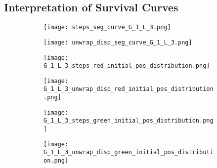    

\subsection{Interpretation of Survival Curves}


   \begin{figure}
        \centering
        \begin{subfigure}[b]{0.45\textwidth}
          \texttt{[image: steps\_seg\_curve\_G\_1\_L\_3.png]}
          \caption{}
          \label{fig:steps_seg_curve_G_1_L_3}
        \end{subfigure}
        \hfill
        \begin{subfigure}[b]{0.45\textwidth}
          \texttt{[image: unwrap\_disp\_seg\_curve\_G\_1\_L\_3.png]}
          \caption{}
          \label{fig:disp_seg_curve_G_1_L_3}
        \end{subfigure}
        \caption{}
        \label{fig:seg_curve_G_1_L_3_steps_disp}
   \end{figure}



   \begin{figure}
        \centering
        \begin{subfigure}[b]{0.45\textwidth}
          \texttt{[image: G\_1\_L\_3\_steps\_red\_initial\_pos\_distribution.png]}
          \caption{}
          \label{fig:G_1_L_3_steps_red_initial_pos_distribution}
        \end{subfigure}
        
        \begin{subfigure}[b]{0.45\textwidth}
          \texttt{[image: G\_1\_L\_3\_unwrap\_disp\_red\_initial\_pos\_distribution.png]}
          \caption{}
          \label{fig:G_1_L_3_disp_red_initial_pos_distribution}
        \end{subfigure}
        \caption{}
        \label{fig:G_1_L_3_steps_disp_red}
   \end{figure}


   \begin{figure}
        \centering
        \begin{subfigure}[b]{0.45\textwidth}
          \texttt{[image: G\_1\_L\_3\_steps\_green\_initial\_pos\_distribution.png]}
          \caption{}
          \label{fig:G_1_L_3_steps_green_initial_pos_distribution}
        \end{subfigure}
        
        \begin{subfigure}[b]{0.45\textwidth}
          \texttt{[image: G\_1\_L\_3\_unwrap\_disp\_green\_initial\_pos\_distribution.png]}
          \caption{}
          \label{fig:G_1_L_3_disp_green_initial_pos_distribution}
        \end{subfigure}
        \caption{}
        \label{fig:G_1_L_3_steps_disp_green}
   \end{figure}




